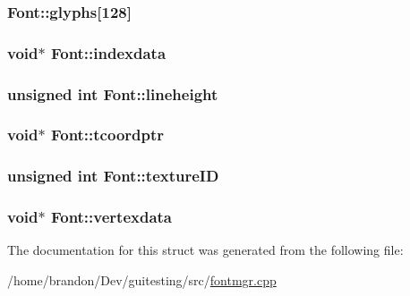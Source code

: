 \hypertarget{struct_font_6abfbebb57f4453f2741be71c9713cfb}{
\subsubsection[{glyphs}]{ {\bf Font::glyphs}\mbox{[}128\mbox{]}}}
\label{struct_font_6abfbebb57f4453f2741be71c9713cfb}


\hypertarget{struct_font_bc7838a3f39e83417a0d53192a75e0e1}{
\subsubsection[{indexdata}]{\setlength{\rightskip}{0pt plus 5cm}void$\ast$ {\bf Font::indexdata}}}
\label{struct_font_bc7838a3f39e83417a0d53192a75e0e1}


\hypertarget{struct_font_1396046bb4860d92c8af99c842067ad8}{
\subsubsection[{lineheight}]{\setlength{\rightskip}{0pt plus 5cm}unsigned int {\bf Font::lineheight}}}
\label{struct_font_1396046bb4860d92c8af99c842067ad8}


\hypertarget{struct_font_ade2862a98a99616113c3da2be293869}{
\subsubsection[{tcoordptr}]{\setlength{\rightskip}{0pt plus 5cm}void$\ast$ {\bf Font::tcoordptr}}}
\label{struct_font_ade2862a98a99616113c3da2be293869}


\hypertarget{struct_font_a7f41941910448dfbc0d53d2f8298788}{
\subsubsection[{textureID}]{\setlength{\rightskip}{0pt plus 5cm}unsigned int {\bf Font::textureID}}}
\label{struct_font_a7f41941910448dfbc0d53d2f8298788}


\hypertarget{struct_font_bf8e8b2ba6bd8cd366815378298eb72c}{
\subsubsection[{vertexdata}]{\setlength{\rightskip}{0pt plus 5cm}void$\ast$ {\bf Font::vertexdata}}}
\label{struct_font_bf8e8b2ba6bd8cd366815378298eb72c}




The documentation for this struct was generated from the following file:\begin{CompactItemize}
\item 
/home/brandon/Dev/guitesting/src/\hyperlink{fontmgr_8cpp}{fontmgr.cpp}\end{CompactItemize}
